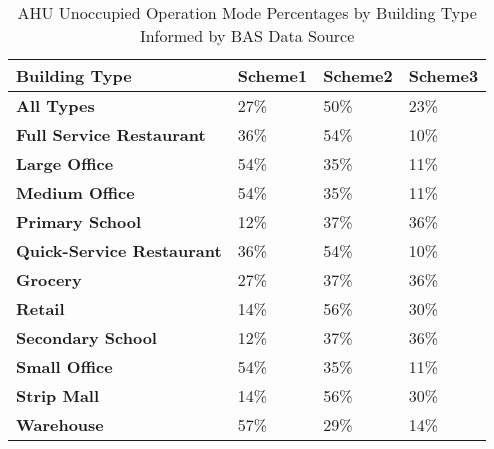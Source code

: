 \begin{table}[h!]
\centering
\small
\caption[AHU Unoccupied Operation Mode Percentages]{AHU Unoccupied Operation Mode Percentages by Building Type Informed by BAS Data Source}
\label{tab:unnoc_ahu_scheme_prev}
\begin{tabular}{|l|l|l|l|}
\hline
\textbf{Building Type}              & \textbf{Scheme1} & \textbf{Scheme2} & \textbf{Scheme3} \\ \hline
\textbf{All   Types}                & 27\%             & 50\%             & 23\%             \\ \hline
\textbf{Full Service   Restaurant}  & 36\%             & 54\%             & 10\%             \\ \hline
\textbf{Large   Office}             & 54\%             & 35\%             & 11\%             \\ \hline
\textbf{Medium   Office}            & 54\%             & 35\%             & 11\%             \\ \hline
\textbf{Primary   School}          & 12\%             & 37\%             & 36\%             \\ \hline
\textbf{Quick-Service   Restaurant} & 36\%             & 54\%             & 10\%             \\ \hline
\textbf{Grocery}                   & 27\%             & 37\%             & 36\%             \\ \hline
\textbf{Retail}                     & 14\%             & 56\%             & 30\%             \\ \hline
\textbf{Secondary   School}        & 12\%             & 37\%             & 36\%             \\ \hline
\textbf{Small   Office}             & 54\%             & 35\%             & 11\%             \\ \hline
\textbf{Strip   Mall}               & 14\%             & 56\%             & 30\%             \\ \hline
\textbf{Warehouse}                 & 57\%             & 29\%             & 14\%             \\ \hline
\end{tabular}
\end{table}